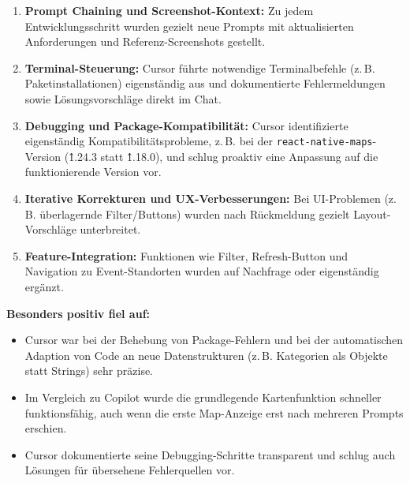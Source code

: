 \begin{enumerate}
    \item \textbf{Prompt Chaining und Screenshot-Kontext:} Zu jedem Entwicklungsschritt wurden gezielt neue Prompts mit aktualisierten Anforderungen und Referenz-Screenshots gestellt.
    \item \textbf{Terminal-Steuerung:} Cursor führte notwendige Terminalbefehle (z.\,B. Paketinstallationen) eigenständig aus und dokumentierte Fehlermeldungen sowie Lösungsvorschläge direkt im Chat.
    \item \textbf{Debugging und Package-Kompatibilität:} Cursor identifizierte eigenständig Kompatibilitätsprobleme, z.\,B. bei der \texttt{react-native-maps}-Version (\^1.24.3 statt \^1.18.0), und schlug proaktiv eine Anpassung auf die funktionierende Version vor.
    \item \textbf{Iterative Korrekturen und UX-Verbesserungen:} Bei UI-Problemen (z.\,B. überlagernde Filter/Buttons) wurden nach Rückmeldung gezielt Layout-Vorschläge unterbreitet.
    \item \textbf{Feature-Integration:} Funktionen wie Filter, Refresh-Button und Navigation zu Event-Standorten wurden auf Nachfrage oder eigenständig ergänzt.
\end{enumerate}

\textbf{Besonders positiv fiel auf:}
\begin{itemize}
    \item Cursor war bei der Behebung von Package-Fehlern und bei der automatischen
          Adaption von Code an neue Datenstrukturen (z.\,B. Kategorien als Objekte statt
          Strings) sehr präzise.
    \item Im Vergleich zu Copilot wurde die grundlegende Kartenfunktion schneller
          funktionsfähig, auch wenn die erste Map-Anzeige erst nach mehreren Prompts
          erschien.
    \item Cursor dokumentierte seine Debugging-Schritte transparent und schlug auch
          Lösungen für übersehene Fehlerquellen vor.
\end{itemize}

